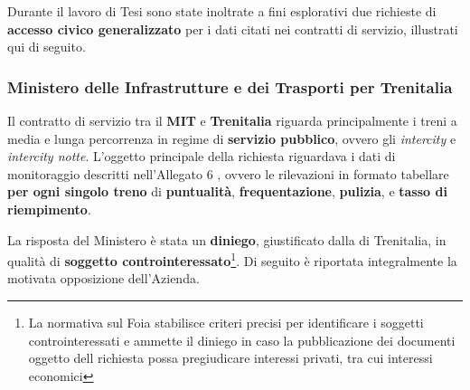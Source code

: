 \documentclass[12pt,a4paper,italian]{report}
\begin{document}
Durante il lavoro di Tesi sono state inoltrate a fini esplorativi due
richieste di \textbf{accesso civico generalizzato} per i dati citati
nei contratti di servizio, illustrati qui di seguito.

\subsubsection{Ministero delle Infrastrutture e dei Trasporti per
    Trenitalia}

Il contratto di servizio tra il \textbf{MIT} e \textbf{Trenitalia}
riguarda principalmente i treni a media e lunga percorrenza in regime
di \textbf{servizio pubblico}, ovvero gli \textit{intercity} e
\textit{intercity notte}.  L'oggetto principale della richiesta
riguardava i dati di monitoraggio descritti nell'Allegato 6
\cite[art.\ 5, comma 1, lettera g]{CdSMIT}, ovvero le rilevazioni in
formato tabellare \textbf{per ogni singolo treno} di
\textbf{puntualità}, \textbf{frequentazione}, \textbf{pulizia}, e
\textbf{tasso di riempimento}.

La risposta del Ministero è stata un \textbf{diniego}, giustificato
dalla  di
Trenitalia, in qualità di \textbf{soggetto
    controinteressato}\footnote{La normativa sul Foia \cite{Dlgs33}
    stabilisce criteri precisi per identificare i soggetti
    controinteressati e ammette il diniego in caso la pubblicazione
    dei documenti oggetto dell richiesta possa pregiudicare interessi
    privati, tra cui interessi economici}.  Di seguito è riportata
integralmente la motivata opposizione dell'Azienda.
\end{document}
